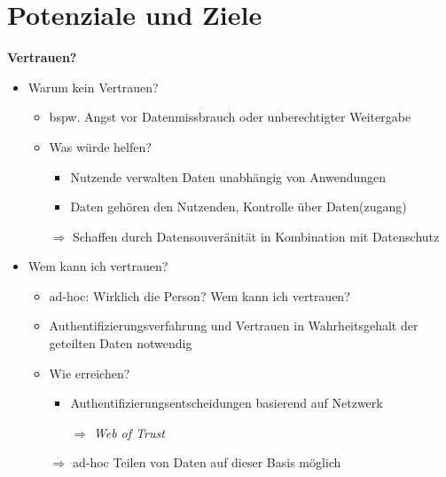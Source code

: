 
\section{Potenziale und Ziele}


\textbf{Vertrauen?}
\begin{itemize}
    \item Warum kein Vertrauen?
    \begin{itemize}
        \item bspw. Angst vor Datenmissbrauch oder unberechtigter Weitergabe
        \item Was würde helfen?
        \begin{itemize}
            \item Nutzende verwalten Daten unabhängig von Anwendungen
            \item Daten gehören den Nutzenden, Kontrolle über Daten(zugang)
        \end{itemize}
        \item[$\Rightarrow$] Schaffen durch Datensouveränität in Kombination mit Datenschutz
    \end{itemize}

    \item Wem kann ich vertrauen?
    \begin{itemize}
        \item ad-hoc: Wirklich die Person? Wem kann ich vertrauen?
        \item Authentifizierungsverfahrung und Vertrauen in Wahrheitsgehalt der geteilten Daten notwendig
        \item Wie erreichen?
        \begin{itemize}
            \item Authentifizierungsentscheidungen basierend auf Netzwerk
            \item[$\Rightarrow$] \emph{Web of Trust}
        \end{itemize}
        \item[$\Rightarrow$] ad-hoc Teilen von Daten auf dieser Basis möglich
    \end{itemize}
    

\end{itemize}
